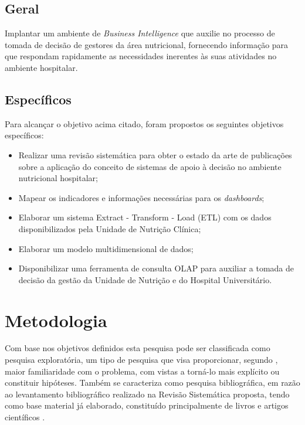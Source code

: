 \subsection{Geral}\label{sec-divisoes-subsection}
Implantar um ambiente de \textit{Business Intelligence} que auxilie no processo de tomada de decisão de gestores da área nutricional, fornecendo informação para que respondam rapidamente as necessidades inerentes às suas atividades no ambiente hospitalar.

\subsection{Específicos}\label{sec-divisoes-subsection}
Para alcançar o objetivo acima citado, foram propostos os seguintes objetivos específicos:
\begin{itemize}
 \item Realizar uma revisão sistemática para obter o estado da arte de publicações sobre a aplicação do conceito de sistemas de apoio à decisão no ambiente nutricional hospitalar;

 \item Mapear os indicadores e informações necessárias para os \textit{dashboards};

 \item Elaborar um sistema Extract - Transform - Load (ETL) com os dados disponibilizados pela Unidade de Nutrição Clínica;
 
 \item Elaborar um modelo multidimensional de dados;
 
 \item Disponibilizar uma ferramenta de consulta OLAP para auxiliar a tomada de decisão da gestão da Unidade de Nutrição e do Hospital Universitário.
\end{itemize}

\section{Metodologia}\label{sec-divisoes}
Com base nos objetivos definidos esta pesquisa pode ser classificada como pesquisa exploratória, um tipo de pesquisa que visa proporcionar, segundo , maior familiaridade com o problema, com vistas a torná-lo mais explícito ou constituir hipóteses.
Também se caracteriza como pesquisa bibliográfica, em razão ao levantamento bibliográfico realizado na Revisão Sistemática proposta, tendo como base material já elaborado, constituído principalmente de livros e artigos científicos \cite{gil2002}.

